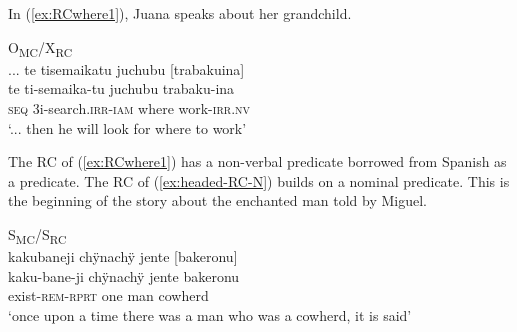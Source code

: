 In (\ref{ex:RCwhere1}), Juana speaks about her grandchild.

\ea\label{ex:RCwhere1}
\begingl
\glpreamble \textup{O\textsubscript{MC}/X\textsubscript{RC}}\\... te tisemaikatu juchubu \textup{[}trabakuina\textup{]}\\
\gla te ti-semaika-tu juchubu trabaku-ina\\
\glb \textsc{seq} 3i-search.\textsc{irr}-\textsc{iam} where work-\textsc{irr.nv}\\
\glft ‘... then he will look for where to work’
\endgl
\trailingcitation{[jxx-p110923l-1.193]}
\xe

The RC of (\ref{ex:RCwhere1}) has a non-verbal predicate borrowed from Spanish as a predicate. The RC of (\ref{ex:headed-RC-N}) builds on a nominal predicate. This is the beginning of the story about the enchanted man told by Miguel.

\ea\label{ex:headed-RC-N}
\begingl
\glpreamble \textup{S\textsubscript{MC}/S\textsubscript{RC}}\\kakubaneji chÿnachÿ jente \textup{[}bakeronu\textup{]}\\
\gla kaku-bane-ji chÿnachÿ jente bakeronu\\
\glb exist-\textsc{rem}-\textsc{rprt} one man cowherd\\
\glft ‘once upon a time there was a man who was a cowherd, it is said’
\endgl
\trailingcitation{[mxx-n151017l-1.01]}
\xe

%

